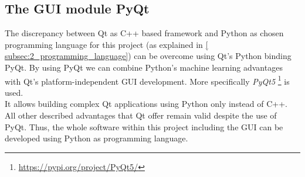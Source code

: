 \subsection*{The \acs*{GUI} module PyQt}\label{subsec:2_pyqt}
The discrepancy between Qt as C++ based framework and Python as chosen
programming language for this project (as explained in \autoref{
subsec:2_programming_language}) can be overcome using Qt's Python binding PyQt.
By using PyQt we can combine Python's machine learning advantages with Qt's 
platform-independent \ac{GUI} development.
More specifically \textit{PyQt5} \footnote{\url{https://pypi.org/project/PyQt5/}} 
is used.\\
It allows building complex Qt applications using Python only instead of C++.
All other described advantages that Qt offer remain valid despite the use 
of PyQt.
Thus, the whole software within this project including the \ac{GUI} can be 
developed using Python as programming language.